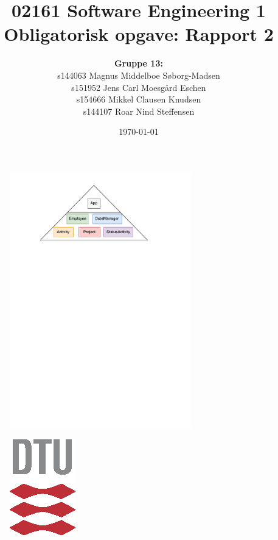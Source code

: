 


\title{02161 Software Engineering 1 \\
Obligatorisk opgave: Rapport 2}
\author{\textbf{Gruppe 13:} \\ 
s144063	Magnus Middelboe Søborg-Madsen \\
s151952	Jens Carl Moesgård Eschen \\
s154666	Mikkel Clausen Knudsen \\
s144107	Roar Nind Steffensen}
\date{\today}


\maketitle

\begin{figure}[H]
    \centering
    \includegraphics[width = 0.7\textwidth]{Figurer/totrin.pdf}
\end{figure}

\vspace{0.5 cm}

\begin{figure}[H]
    \centering
    \includegraphics{Figurer/DTU3CMYK.eps}
\end{figure}

